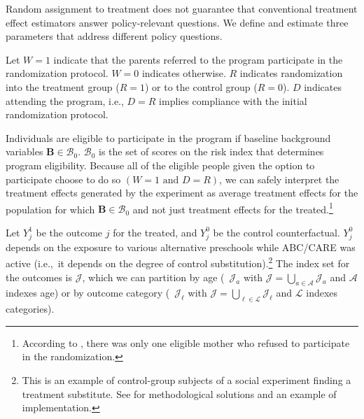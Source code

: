 Random assignment to treatment does not guarantee that conventional treatment effect estimators answer policy-relevant questions. We define and estimate three parameters that address different policy questions.

Let $W=1$ indicate that the parents referred to the program participate in the randomization protocol. $W=0$ indicates otherwise. $R$ indicates randomization into the treatment group ($R = 1$) or to the control group ($R = 0$). $D$ indicates attending the program, i.e., $D = R$ implies compliance with the initial randomization protocol.

Individuals are eligible to participate in the program if baseline background variables $\bm{B}\in\mathcal{B}_0$. $\mathcal{B}_0$ is the set of scores on the risk index that determines program eligibility. Because all of the eligible people given the option to participate choose to do so $(W=1\text{ and } D=R)$, we can safely interpret the treatment effects generated by the experiment as average treatment effects for the population for which $\bm{B}\in\mathcal{B}_0$ and not just treatment effects for the treated.\footnote{According to \citet{Ramey_Yeates_Short_1984_CD}, there was only one eligible mother who refused to participate in the randomization.}

Let $Y^1_{j}$ be the outcome $j$ for the treated, and $Y^0_{j}$ be the control counterfactual. $Y^0_{j}$ depends on the exposure to various alternative preschools while ABC/CARE was active (i.e.,\ it depends on the degree of control substitution).\footnote{This is an example of control-group subjects of a social experiment finding a treatment substitute. See \cite{Heckman_Hohmann_etal_2000_QJE} for methodological solutions and an example of implementation.} The index set for the outcomes is $\mathcal{J}$, which we can partition by age (\ $\mathcal{J}_a$ with $\mathcal{J} = \bigcup \limits _{a \in \mathcal{A}} \mathcal{J}_a$ and $\mathcal{A}$ indexes age) or by outcome category (\ $\mathcal{J}_\ell$ with $\mathcal{J} = \bigcup \limits _{\ell \in \mathcal{L}} \mathcal{J}_\ell$ and $\mathcal{L}$ indexes categories).

